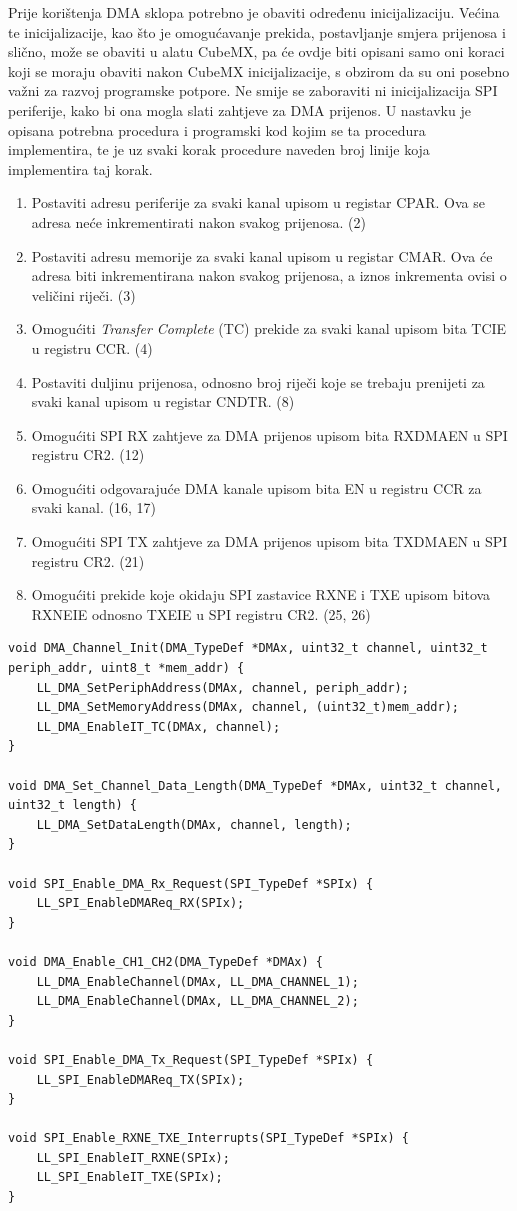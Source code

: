 Prije korištenja DMA sklopa potrebno je obaviti određenu inicijalizaciju. Većina te inicijalizacije, kao što je omogućavanje prekida, postavljanje smjera prijenosa i slično, može se obaviti u alatu CubeMX, pa će ovdje biti opisani samo oni koraci koji se moraju obaviti nakon CubeMX inicijalizacije, s obzirom da su oni posebno važni za razvoj programske potpore. Ne smije se zaboraviti ni inicijalizacija SPI periferije, kako bi ona mogla slati zahtjeve za DMA prijenos. U nastavku je opisana potrebna procedura i programski kod kojim se ta procedura implementira, te je uz svaki korak procedure naveden broj linije koja implementira taj korak.

\begin{enumerate}
	\item Postaviti adresu periferije za svaki kanal upisom u registar CPAR. Ova se adresa neće inkrementirati nakon svakog prijenosa. (2)
	\item Postaviti adresu memorije za svaki kanal upisom u registar CMAR. Ova će adresa biti inkrementirana nakon svakog prijenosa, a iznos inkrementa ovisi o veličini riječi. (3)
	\item Omogućiti \textit{Transfer Complete} (TC) prekide za svaki kanal upisom bita TCIE u registru CCR. (4)
	\item Postaviti duljinu prijenosa, odnosno broj riječi koje se trebaju prenijeti za svaki kanal upisom u registar CNDTR. (8)
	\item Omogućiti SPI RX zahtjeve za DMA prijenos upisom bita RXDMAEN u SPI registru CR2. (12)
	\item Omogućiti odgovarajuće DMA kanale upisom bita EN u registru CCR za svaki kanal. (16, 17)
	\item Omogućiti SPI TX zahtjeve za DMA prijenos upisom bita TXDMAEN u SPI registru CR2. (21)
	\item Omogućiti prekide koje okidaju SPI zastavice RXNE i TXE upisom bitova RXNEIE odnosno TXEIE u SPI registru CR2. (25, 26)
\end{enumerate}

\begin{lstlisting}
void DMA_Channel_Init(DMA_TypeDef *DMAx, uint32_t channel, uint32_t periph_addr, uint8_t *mem_addr) {
	LL_DMA_SetPeriphAddress(DMAx, channel, periph_addr);
	LL_DMA_SetMemoryAddress(DMAx, channel, (uint32_t)mem_addr);
	LL_DMA_EnableIT_TC(DMAx, channel);
}

void DMA_Set_Channel_Data_Length(DMA_TypeDef *DMAx, uint32_t channel, uint32_t length) {
	LL_DMA_SetDataLength(DMAx, channel, length);
}

void SPI_Enable_DMA_Rx_Request(SPI_TypeDef *SPIx) {
	LL_SPI_EnableDMAReq_RX(SPIx);
}

void DMA_Enable_CH1_CH2(DMA_TypeDef *DMAx) {
	LL_DMA_EnableChannel(DMAx, LL_DMA_CHANNEL_1);
	LL_DMA_EnableChannel(DMAx, LL_DMA_CHANNEL_2);
}

void SPI_Enable_DMA_Tx_Request(SPI_TypeDef *SPIx) {
	LL_SPI_EnableDMAReq_TX(SPIx);
}

void SPI_Enable_RXNE_TXE_Interrupts(SPI_TypeDef *SPIx) {
	LL_SPI_EnableIT_RXNE(SPIx);
	LL_SPI_EnableIT_TXE(SPIx);
}
\end{lstlisting}

